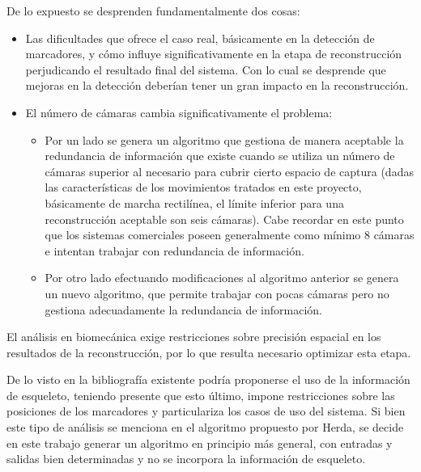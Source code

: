 De lo expuesto se desprenden fundamentalmente dos cosas:
\begin{itemize}
\item Las dificultades que ofrece el caso real, básicamente en la detección de marcadores, y cómo influye significativamente en la etapa de reconstrucción perjudicando el resultado final del sistema. Con lo cual se desprende que mejoras en la detección deberían tener un gran impacto en la reconstrucción.
\item El número de cámaras cambia significativamente el problema:
\vspace{-0.3cm}
\begin{itemize}
\item Por un lado se genera un algoritmo que gestiona de manera aceptable la redundancia de información que existe cuando se utiliza un número de cámaras superior al necesario para cubrir cierto espacio de captura (dadas las características de los movimientos tratados en este proyecto, básicamente de marcha rectilínea, el límite inferior para una reconstrucción aceptable son seis cámaras). Cabe recordar en este punto que los sistemas comerciales poseen generalmente como mínimo 8 cámaras e intentan trabajar con redundancia de información.
\item Por otro lado efectuando modificaciones al algoritmo anterior se genera un nuevo algoritmo, que permite trabajar con pocas cámaras pero no gestiona adecuadamente la redundancia de información.
\end{itemize}  
\end{itemize} 

El análisis en biomecánica exige restricciones sobre precisión espacial en los resultados de la reconstrucción, por lo que resulta necesario optimizar esta etapa. 

De lo visto en la bibliografía existente podría proponerse el uso de la información de esqueleto, teniendo presente que esto último, impone restricciones sobre las posiciones de los marcadores y particulariza los casos de uso del sistema. Si bien este tipo de análisis se menciona en el algoritmo propuesto por Herda, se decide en este trabajo generar un algoritmo en principio más general, con entradas y salidas bien determinadas y no se incorpora la información de esqueleto. \\
 
 
 
